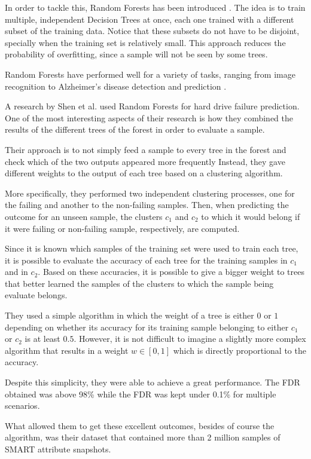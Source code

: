 In order to tackle this, Random Forests has been introduced \cite{ho1995random}.
The idea is to train multiple, independent Decision Trees at once, each one trained with a different subset of the training data.
Notice that these subsets do not have to be disjoint, specially when the training set is relatively small.
This approach reduces the probability of overfitting, since a sample will not be seen by some trees.

Random Forests have performed well for a variety of tasks, ranging from image recognition to Alzheimer's disease detection and prediction \cite{shaik2019brief}.

A research by Shen et al. \cite{Shen18} used Random Forests for hard drive failure prediction.
One of the most interesting aspects of their research is how they combined the results of the different trees of the forest in order to evaluate a sample.

Their approach is to not simply feed a sample to every tree in the forest and check which of the two outputs appeared more frequently
Instead, they gave different weights to the output of each tree based on a clustering algorithm.

More specifically, they performed two independent clustering processes, one for the failing and another to the non-failing samples.
Then, when predicting the outcome for an unseen sample, the clusters $c_1$ and $c_2$ to which it would belong if it were failing or non-failing sample, respectively, are computed.

Since it is known which samples of the training set were used to train each tree, it is possible to evaluate the accuracy of each tree for the training samples in $c_1$ and in $c_2$.
Based on these accuracies, it is possible to give a bigger weight to trees that better learned the samples of the clusters to which the sample being evaluate belongs.

They used a simple algorithm in which the weight of a tree is either $0$ or $1$ depending on whether its accuracy for its training sample belonging to either $c_1$ or $c_2$ is at least $0.5$.
However, it is not difficult to imagine a slightly more complex algorithm that results in a weight $w \in \left[0,1\right]$ which is directly proportional to the accuracy.

Despite this simplicity, they were able to achieve a great performance.
The FDR obtained was above 98\% while the FDR was kept under 0.1\% for multiple scenarios.

What allowed them to get these excellent outcomes, besides of course the algorithm, was their dataset that contained more than 2 million samples of SMART attribute snapshots.

